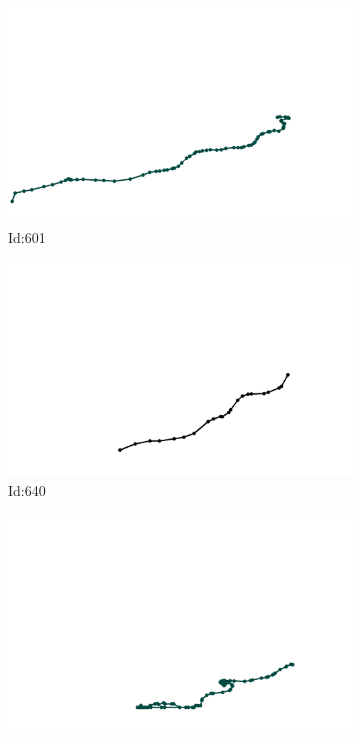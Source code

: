 \documentclass[12pt,twoside]{report}
\begin{document}
\begin{figure}
\begin{subfigure}[b]{0.20\textwidth}
\centering
\includegraphics[width=\textwidth]{../trajectories/601.png}
\caption{Id:601}
\end{subfigure}
\begin{subfigure}[b]{0.20\textwidth}
\centering
\includegraphics[width=\textwidth]{../trajectories/640.png}
\caption{Id:640}
\end{subfigure}
\begin{subfigure}[b]{0.20\textwidth}
\centering
\includegraphics[width=\textwidth]{../trajectories/650.png}

\end{subfigure}
\end{figure}
\end{document}
